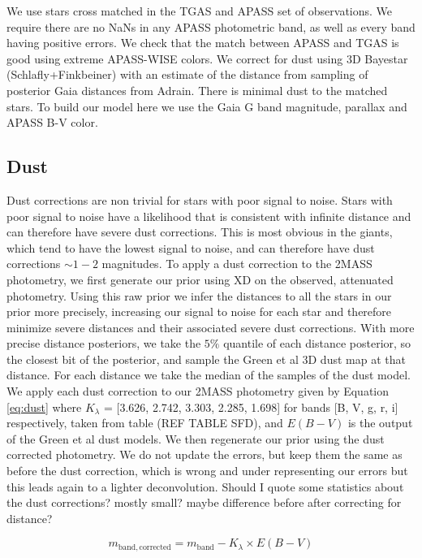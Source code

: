 \documentclass[12pt, preprint]{aastex6}
\begin{document}
We use stars cross matched in the TGAS and APASS set of observations. We require there are no NaNs in any APASS photometric band, as well as every band having positive errors. We check that the match between APASS and TGAS is good using extreme APASS-WISE colors. We correct for dust using 3D Bayestar (Schlafly+Finkbeiner) with an estimate of the distance from sampling of posterior Gaia distances from Adrain. There is minimal dust to the matched stars. To build our model here we use the Gaia G band magnitude, parallax and APASS B-V color.

\subsection{Dust}

Dust corrections are non trivial for stars with poor signal to noise. Stars with poor signal to noise have a likelihood that is consistent with infinite distance and can therefore have severe dust corrections. This is most obvious in the giants, which tend to have the lowest signal to noise, and can therefore have dust corrections $\sim 1-2$ magnitudes. To apply a dust correction to the 2MASS photometry, we first generate our prior using XD on the observed, attenuated photometry. Using this raw prior we infer the distances to all the stars in our prior more precisely, increasing our signal to noise for each star and therefore minimize severe distances and their associated severe dust corrections. With more precise distance posteriors, we take the $5\%$ quantile of each distance posterior, so the closest bit of the posterior, and sample the Green et al 3D dust map at that distance. For each distance we take the median of the samples of the dust model. We apply each dust correction to our 2MASS photometry given by Equation \ref{eq:dust} where $K_{\lambda}$ = [3.626, 2.742, 3.303, 2.285, 1.698] for bands [B, V, g, r, i] respectively, taken from table (REF TABLE SFD), and $E(B-V)$ is the output of the Green et al dust models. We then regenerate our prior using the dust corrected photometry. We do not update the errors, but keep them the same as before the dust correction, which is wrong and under representing our errors but this leads again to a lighter deconvolution. Should I quote some statistics about the dust corrections? mostly small? maybe difference before after correcting for distance?

\begin{equation}
\label{eq:dust}
m_{\mathrm{band, corrected}} = m_{\mathrm{band}} - K_{\lambda} \times E(B-V)
\end{equation}
\end{document}
